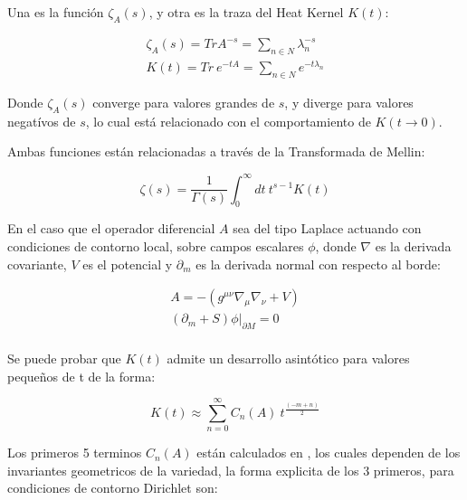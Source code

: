 Una es la función $ \zeta _A (s)$, y otra es la traza del Heat Kernel $K(t)$:

\begin{equation}
\begin{array}{c}
\zeta _A (s) = Tr A ^{-s} = \sum \limits_{n \in N}   \lambda _n ^{-s} \\[10pt]
K (t) =  Tr \ e ^{-t A} = \sum \limits_{n \in N} e ^{-t \lambda _{n} }
\end{array}
\label{funcion.zeta}
\end{equation}

Donde $\zeta _A (s) $ converge para valores grandes de $s$, y diverge para valores negatívos de $s$, lo cual está relacionado con el comportamiento de $K(t \rightarrow 0 )$. 


Ambas funciones están relacionadas a través de la Transformada de Mellin:




\begin{equation}
\zeta (s) = \frac{1}{\Gamma (s) } 
\int _0 ^{\infty} dt \
t ^{s-1} K(t) 
\end{equation}


En el caso que el operador diferencial $A$ sea del tipo Laplace actuando con condiciones de contorno local, sobre campos escalares $\phi $, donde $\nabla$ es la derivada covariante, $V$ es el potencial y $\partial _m$ es la derivada normal con respecto al borde:

\begin{equation}
\begin{array}{c}

A = - \left(
			g ^{\mu \nu} \nabla _{\mu} \nabla _{\nu} + V
			\right) \\
\left (\partial _m + S \right) \phi | _{\partial M} = 0 \\[10pt]

\end{array}
\end{equation}

Se puede probar que $K(t)$ admite un desarrollo asintótico para valores pequeños de t  de la forma:

\begin{equation}
K(t) \approx 
\sum _{n=0} ^{\infty}
C _n (A) \ 
t ^{\frac{(-m+n)}{2}} 
\label{eq.heat.expansion}
\end{equation}



Los primeros 5 terminos $C _n (A) $ están calculados en \cite{VASSILEVICH2003279}, los cuales dependen de los invariantes geometricos de la variedad, la forma explicita de los 3 primeros, para condiciones de contorno Dirichlet son: 

